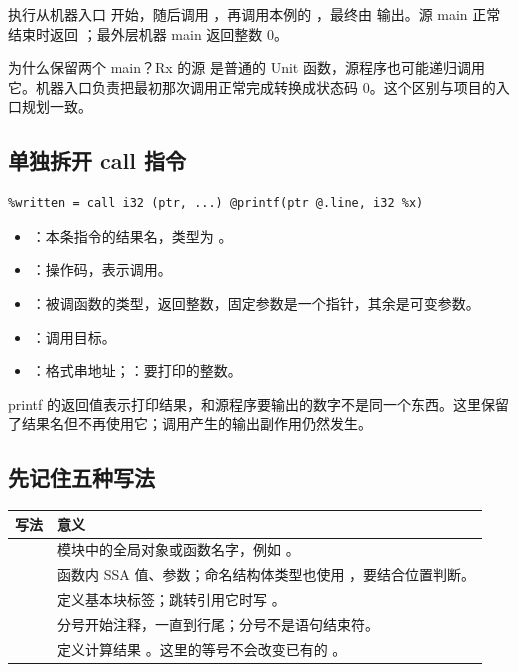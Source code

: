 执行从机器入口  开始，随后调用 ，再调用本例的 ，最终由  输出。源 main 正常结束时返回 ；最外层机器 main 返回整数 0。

为什么保留两个 main？Rx 的源  是普通的 Unit 函数，源程序也可能递归调用它。机器入口负责把最初那次调用正常完成转换成状态码 0。这个区别与项目的入口规划一致。

\subsection{单独拆开 call 指令}
\begin{lstlisting}
%written = call i32 (ptr, ...) @printf(ptr @.line, i32 %x)
\end{lstlisting}
\begin{itemize}
 \item {}：本条指令的结果名，类型为 。
 \item {}：操作码，表示调用。
 \item {}：被调函数的类型，返回整数，固定参数是一个指针，其余是可变参数。
 \item {}：调用目标。
 \item {}：格式串地址；：要打印的整数。
\end{itemize}
printf 的返回值表示打印结果，和源程序要输出的数字不是同一个东西。这里保留了结果名但不再使用它；调用产生的输出副作用仍然发生。



\subsection{先记住五种写法}
\begin{tabularx}{\linewidth}{@{}p{38mm}Y@{}}
\toprule
写法 & 意义 \\
\midrule
{} & 模块中的全局对象或函数名字，例如 。\\
 & 函数内 SSA 值、参数；命名结构体类型也使用 \code{\%}，要结合位置判断。\\
 & 定义基本块标签；跳转引用它时写 。\\
 & 分号开始注释，一直到行尾；分号不是语句结束符。\\
 & 定义计算结果 。这里的等号不会改变已有的 。\\
\bottomrule
\end{tabularx}

